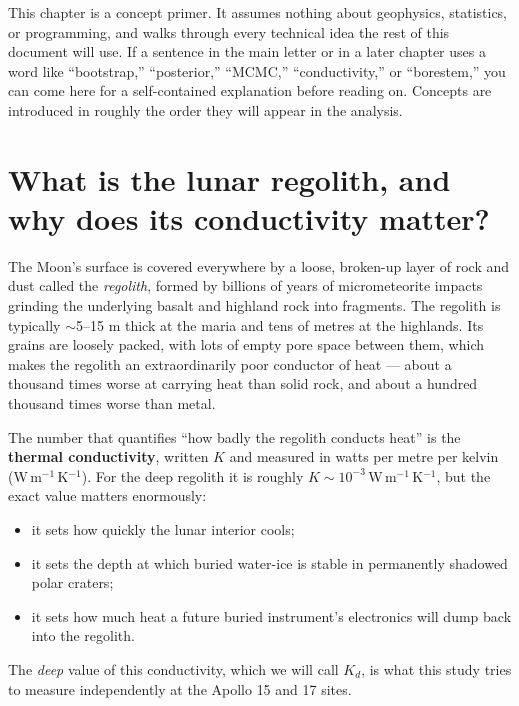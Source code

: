 \documentclass[11pt]{report}
\begin{document}
This chapter is a concept primer. It assumes nothing about
geophysics, statistics, or programming, and walks through every
technical idea the rest of this document will use. If a sentence
in the main letter or in a later chapter uses a word like
``bootstrap,'' ``posterior,'' ``MCMC,'' ``conductivity,'' or
``borestem,'' you can come here for a self-contained explanation
before reading on. Concepts are introduced in roughly the order
they will appear in the analysis.

\section{What is the lunar regolith, and why does its conductivity
matter?}

The Moon's surface is covered everywhere by a loose, broken-up
layer of rock and dust called the \emph{regolith}, formed by
billions of years of micrometeorite impacts grinding the underlying
basalt and highland rock into fragments. The regolith is typically
$\sim$5--15 m thick at the maria and tens of metres at the
highlands. Its grains are loosely packed, with lots of empty pore
space between them, which makes the regolith an extraordinarily
poor conductor of heat --- about a thousand times worse at carrying
heat than solid rock, and about a hundred thousand times worse than
metal.

The number that quantifies ``how badly the regolith conducts heat''
is the \textbf{thermal conductivity}, written $K$ and measured in
watts per metre per kelvin (W\,m$^{-1}$\,K$^{-1}$). For the deep
regolith it is roughly $K \sim 10^{-3}$\,W\,m$^{-1}$\,K$^{-1}$, but
the exact value matters enormously:

\begin{itemize}\itemsep2pt
  \item it sets how quickly the lunar interior cools;
  \item it sets the depth at which buried water-ice is stable in
        permanently shadowed polar craters;
  \item it sets how much heat a future buried instrument's
        electronics will dump back into the regolith.
\end{itemize}

The \emph{deep} value of this conductivity, which we will call
$K_d$, is what this study tries to measure independently at the
Apollo 15 and 17 sites.

\end{document}
